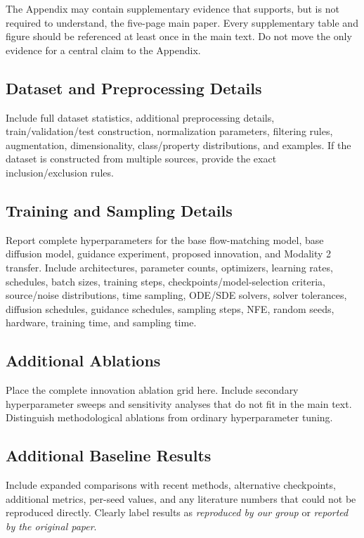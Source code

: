 \documentclass{article}
\begin{document}
The Appendix may contain supplementary evidence that supports, but is not required to understand, the five-page main paper. Every supplementary table and figure should be referenced at least once in the main text. Do not move the only evidence for a central claim to the Appendix.

\subsection{Dataset and Preprocessing Details}

Include full dataset statistics, additional preprocessing details, train/validation/test construction, normalization parameters, filtering rules, augmentation, dimensionality, class/property distributions, and examples. If the dataset is constructed from multiple sources, provide the exact inclusion/exclusion rules.

\subsection{Training and Sampling Details}

Report complete hyperparameters for the base flow-matching model, base diffusion model, guidance experiment, proposed innovation, and Modality 2 transfer. Include architectures, parameter counts, optimizers, learning rates, schedules, batch sizes, training steps, checkpoints/model-selection criteria, source/noise distributions, time sampling, ODE/SDE solvers, solver tolerances, diffusion schedules, guidance schedules, sampling steps, NFE, random seeds, hardware, training time, and sampling time.

\subsection{Additional Ablations}

Place the complete innovation ablation grid here. Include secondary hyperparameter sweeps and sensitivity analyses that do not fit in the main text. Distinguish methodological ablations from ordinary hyperparameter tuning.

\subsection{Additional Baseline Results}

Include expanded comparisons with recent methods, alternative checkpoints, additional metrics, per-seed values, and any literature numbers that could not be reproduced directly. Clearly label results as \emph{reproduced by our group} or \emph{reported by the original paper}.
\end{document}
